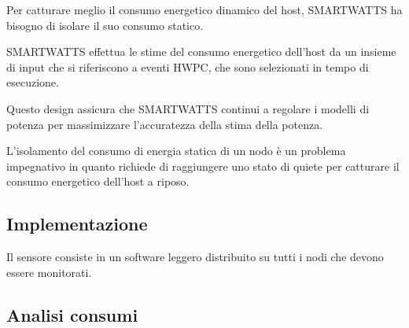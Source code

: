 \documentclass[a4paper, 11pt]{article}
\begin{document}
Per catturare meglio il consumo energetico dinamico del host, SMARTWATTS ha bisogno di isolare il suo consumo statico.

SMARTWATTS effettua le stime del consumo energetico dell'host da un insieme di input che si riferiscono a eventi HWPC, che sono selezionati in tempo di esecuzione.

Questo design assicura che SMARTWATTS continui a regolare i
modelli di potenza per massimizzare l'accuratezza della stima della potenza.

L'isolamento del consumo di energia statica di un nodo è un
problema impegnativo in quanto richiede di raggiungere uno stato di quiete per catturare il consumo energetico dell'host a riposo.

\subsection{Implementazione}
Il sensore consiste in un software leggero distribuito su tutti i nodi che devono essere monitorati.


\subsection{Analisi consumi}
\end{document}
